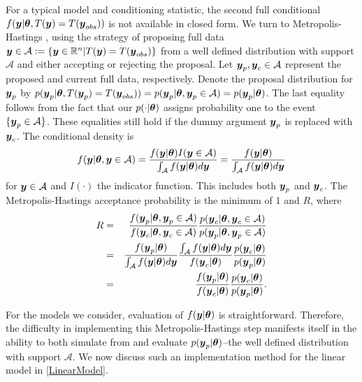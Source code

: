 \documentclass[ba]{imsart}
\def\bth{\mbox{\boldmath $\theta$}}
\newcommand{\by}{\mbox{\boldmath $y$}}
\newcommand{\mc}{\mathcal}
\newcommand{\blue}[1]{{\color{blue}#1}}
\begin{document}
For a typical model and conditioning statistic, the second full conditional $f(\by|\bth, T(\by)=T(\by_{obs}))$ %
is not available in closed form.  We turn to Metropolis-Hastings \citep{hastings1970},
using the strategy of proposing full data $\by \in \mathcal{A}:=\{\by \in \mathbb{R}^n | T(\by)=T(\by_{obs})\}$ from a well defined distribution with support $\mathcal{A}$ and either accepting or rejecting the
proposal. Let $\by_p, \by_c \in \mathcal{A}$ represent the proposed and current
full data, respectively. Denote the proposal distribution for $\by_{p}$ by $p(\by_p|\bth,T(\by_p) = T(\by_{obs})) = p(\by_p|\bth,\by_p \in \mathcal{A}) = p(\by_p | \bth)$.  The last equality follows from the fact that our $p(\cdot | \bth)$ assigns probability one to the event $\{ \by_p \in \mathcal{A} \}$.  These equalities still hold if the dummy argument $\by_p$ is replaced with $\by_c$.  The conditional density is
\begin{eqnarray*}
f(\by | \bth, \by \in \mathcal{A}) =  \frac{f(\by | \bth) I(\by \in \mathcal{A})}{\int_\mathcal{A} f(\by | \bth) d\by} 
      = \frac{f(\by | \bth)}{\int_\mathcal{A} f(\by | \bth) d\by} 
\end{eqnarray*}
for $\by \in \mathcal{A}$ and $I(\cdot)$ the indicator function.  This includes both $\by_p$ and $\by_c$.  The Metropolis-Hastings acceptance probability  is the minimum of 1 and $R$, where
\begin{eqnarray}
\label{MHRatio}
R & = & \frac{f(\by_p|\bth,\by_p \in \mathcal{A})}{f(\by_c|\bth,\by_c \in \mathcal{A})}  
                \frac{p(\by_c|\bth, \by_c \in \mathcal{A})}{p(\by_p|\bth,\by_p \in \mathcal{A})} \\
  & = & \frac{f(\by_p | \bth)}{\int_\mathcal{A} f(\by | \bth) d\by} \frac{\int_\mathcal{A} f(\by | \bth) d\by}{f(\by_c | \bth)} \frac{p(\by_c | \bth)}{p(\by_p | \bth)} \\
 & = & \frac{f(\by_p|\bth)}{f(\by_c|\bth)} \frac{p(\by_c|\bth)}{p(\by_p|\bth)} .  
\end{eqnarray}


For the models we consider, evaluation of $f(\by | \bth)$ is straightforward.  Therefore, the difficulty in implementing this Metropolis-Hastings step manifests  itself in the ability to both simulate from and evaluate $p(\by_p | \bth)$--the well defined distribution with support $\mathcal{A}$. We now discuss such an implementation method for the linear model in \eqref{LinearModel}.
\end{document}
